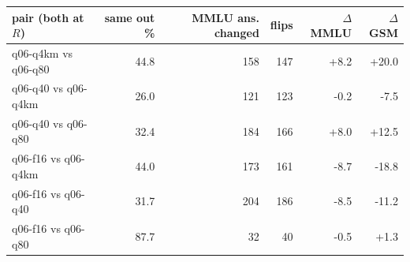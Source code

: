 \begin{tabular}{lrrrrr}
\toprule
pair (both at $R$) & same out \% & MMLU ans. changed & flips & $\Delta$MMLU & $\Delta$GSM\\
\midrule
q06-q4km vs q06-q80 & 44.8 & 158 & 147 & +8.2 & +20.0\\
q06-q40 vs q06-q4km & 26.0 & 121 & 123 & -0.2 & -7.5\\
q06-q40 vs q06-q80 & 32.4 & 184 & 166 & +8.0 & +12.5\\
q06-f16 vs q06-q4km & 44.0 & 173 & 161 & -8.7 & -18.8\\
q06-f16 vs q06-q40 & 31.7 & 204 & 186 & -8.5 & -11.2\\
q06-f16 vs q06-q80 & 87.7 & 32 & 40 & -0.5 & +1.3\\
\bottomrule
\end{tabular}
